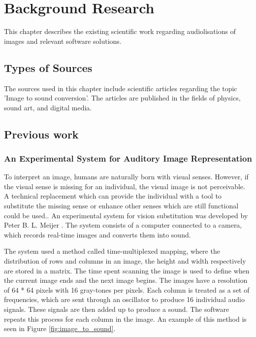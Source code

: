 \chapter{Background Research}\label{ch:bgresearch}
This chapter describes the existing scientific work regarding audiolisations of images and relevant software solutions.

\section{Types of Sources}\label{sec:typesofsources} 
The sources used in this chapter include scientific articles regarding the topic 'Image to sound conversion'. The articles are published in the fields of physics, sound art, and digital media.

\section{Previous work}\label{sec:previouswork}

\subsection{An Experimental System for Auditory Image Representation}\label{sec:experimentalsystem}

To interpret an image, humans are naturally born with visual senses. However, if the visual sense is missing for an individual, the visual image is not perceivable. A technical replacement which can provide the individual with a tool to substitute the missing sense or enhance other senses which are still functional could be used.. An experimental system for vision substitution was developed by Peter B. L. Meijer \cite{Meijer1992}. The system consists of a computer connected to a camera, which records real-time images and converts them into sound. 

The system used a method called time-multiplexed mapping, where the distribution of rows and columns in an image, the height and width respectively are stored in a matrix. The time spent scanning the image is used to define when the current image ends and the next image begins. The images have a resolution of 64 * 64 pixels with 16 gray-tones per pixels. Each column is treated as a set of frequencies, which are sent through an oscillator to produce 16 individual audio signals. These signals are then added up to produce a sound. The software repeats this process for each column in the image. An example of this method is seen in Figure \ref{fig:image_to_sound}. 


